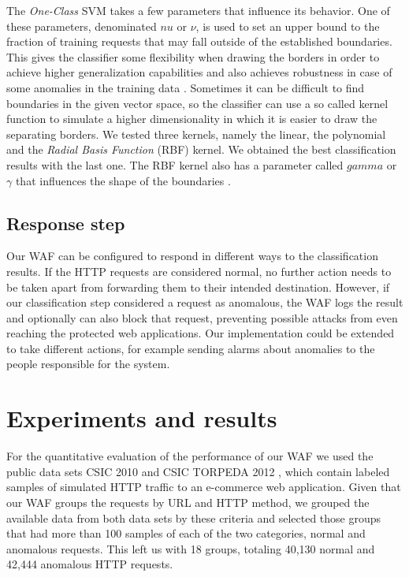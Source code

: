 The \textit{One-Class} SVM takes a few parameters that influence its
behavior.
One of these parameters, denominated $nu$ or $\nu$, is used to set an upper
bound to the fraction of training requests that may fall outside of the
established boundaries. This gives the classifier some flexibility when
drawing the borders in order to achieve higher generalization capabilities
and also achieves robustness in case of some anomalies in the training
data \cite{scholkopf2001estimating}.
Sometimes it can be difficult to find boundaries in the given vector space,
so the classifier can use a so called kernel function to simulate a
higher dimensionality in which it is easier to draw the separating borders.
We tested three kernels, namely the linear, the polynomial and the
\textit{Radial Basis Function} (RBF) kernel. We obtained the best
classification results with the last one.
The RBF kernel also has a parameter called $gamma$ or $\gamma$ that
influences the shape of the boundaries \cite{tran2004one}.


\subsection{Response step}

Our WAF can be configured to respond in different ways to the classification
results. If the HTTP requests are considered normal, no further action
needs to be taken apart from forwarding them to their intended destination.
However, if our classification step considered a request as anomalous,
the WAF logs the result and optionally can also block that request,
preventing possible attacks from even reaching the protected web applications.
Our implementation could be extended to take different actions, for
example sending alarms about anomalies to the people responsible
for the system.


\section{Experiments and results}
\label{chap:results}

For the quantitative evaluation of the performance of our WAF we used the
public data sets CSIC 2010 \cite{csic2010dataset} and CSIC TORPEDA 2012
\cite{torpeda2012dataset}, which contain labeled samples of simulated
HTTP traffic to an e-commerce web application.
Given that our WAF groups the requests by URL and HTTP method, we grouped
the available data from both data sets by these criteria and selected
those groups that had more than 100 samples of each of the two categories,
normal and anomalous requests.
This left us with 18 groups, totaling 40,130 normal and 42,444 anomalous
HTTP requests.


